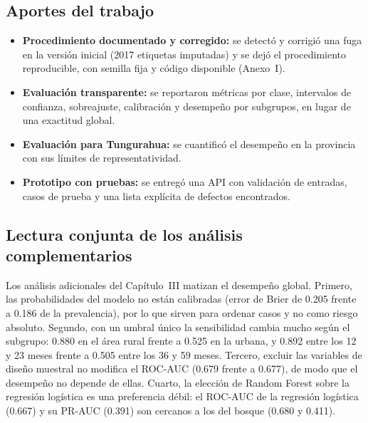 \subsection{Aportes del trabajo}
\begin{itemize}
  \item \textbf{Procedimiento documentado y corregido:} se detectó y corrigió una fuga en la versión inicial (\num{2017} etiquetas imputadas) y se dejó el procedimiento reproducible, con semilla fija y código disponible (Anexo~I).
  \item \textbf{Evaluación transparente:} se reportaron métricas por clase, intervalos de confianza, sobreajuste, calibración y desempeño por subgrupos, en lugar de una exactitud global.
  \item \textbf{Evaluación para Tungurahua:} se cuantificó el desempeño en la provincia con sus límites de representatividad.
  \item \textbf{Prototipo con pruebas:} se entregó una API con validación de entradas, casos de prueba y una lista explícita de defectos encontrados.
\end{itemize}

\subsection{Lectura conjunta de los análisis complementarios}
Los análisis adicionales del Capítulo~III matizan el desempeño global. Primero, las probabilidades del modelo no están calibradas (error de Brier de 0.205 frente a 0.186 de la prevalencia), por lo que sirven para ordenar casos y no como riesgo absoluto. Segundo, con un umbral único la sensibilidad cambia mucho según el subgrupo: 0.880 en el área rural frente a 0.525 en la urbana, y 0.892 entre los 12 y 23 meses frente a 0.505 entre los 36 y 59 meses. Tercero, excluir las variables de diseño muestral no modifica el ROC-AUC (0.679 frente a 0.677), de modo que el desempeño no depende de ellas. Cuarto, la elección de Random Forest sobre la regresión logística es una preferencia débil: el ROC-AUC de la regresión logística (0.667) y su PR-AUC (0.391) son cercanos a los del bosque (0.680 y 0.411).


